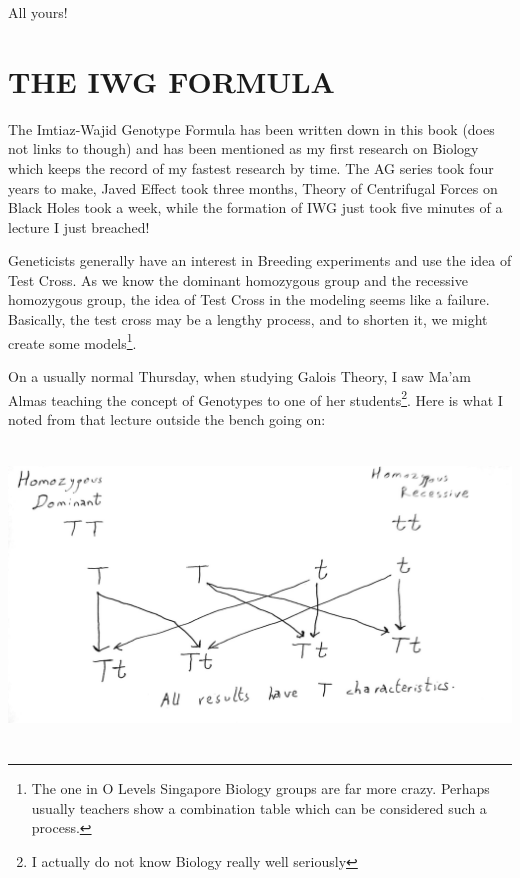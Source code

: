 \documentclass[a4paper,12pt]{book}[2004/02/16]
\theoremstyle{ilemma}
\theoremstyle{itheorem}
\theoremstyle{iother}
\theoremstyle{icorollary}
\theoremstyle{numcorollary}
\theoremstyle{idefinition}
\begin{document}
All yours!
\chapter*{THE IWG FORMULA}
The Imtiaz-Wajid Genotype Formula has been written down in this book (does not links to though) and has been mentioned as my first research on Biology which keeps the record of my fastest research by time. The AG series took four years to make, Javed Effect took three months, Theory of Centrifugal Forces on Black Holes took a week, while the formation of IWG just took five minutes of a lecture I just breached!

Geneticists generally have an interest in Breeding experiments and use the idea of Test Cross. As we know the dominant homozygous group and the recessive homozygous group, the idea of Test Cross in the modeling seems like a failure. Basically, the test cross may be a lengthy process, and to shorten it, we might create some models\footnote{The one in O Levels Singapore Biology groups are far more crazy. Perhaps usually teachers show a combination table which can be considered such a process.}.

On a usually normal Thursday, when studying Galois Theory, I saw Ma'am Almas teaching the concept of Genotypes to one of her students\footnote{I actually do not know Biology really well seriously}. Here is what I noted from that lecture outside the bench going on:

    \includegraphics[width=\textwidth,height=80mm]{New Doc 12-12-2022 19.57_3-modified.jpg}
\end{document}
